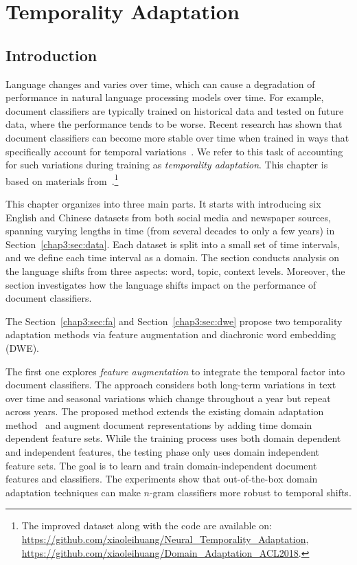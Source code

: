 \chapter{Temporality Adaptation}
\label{chp:temporality}

\section{Introduction}
Language changes and varies over time,
which can cause a degradation of performance in
natural language processing models over time.
For example, document classifiers are typically trained on historical data and tested on future data, where the performance tends to be worse.
Recent research has shown that document classifiers can become more stable over time when trained in ways that specifically account for temporal variations~\cite{he2018time}.
We refer to this task of accounting for such variations during training as {\em temporality adaptation}.
This chapter is based on materials from~\cite{huang2018examining, huang2019neural}.\footnote{The improved dataset along with the code are available on: \\\url{https://github.com/xiaoleihuang/Neural_Temporality_Adaptation}, \\\url{https://github.com/xiaoleihuang/Domain_Adaptation_ACL2018}.}

This chapter organizes into three main parts.
It starts with introducing six English and Chinese datasets from both social media and newspaper sources, spanning varying lengths in time (from several decades to only a few years) in Section~\ref{chap3:sec:data}. 
Each dataset is split into a small set of time intervals, and we define each time interval as a domain. 
The section conducts analysis on the language shifts from three aspects: word, topic, context levels. 
Moreover, the section investigates how the language shifts impact on the performance of document classifiers.

The Section~\ref{chap3:sec:fa} and Section~\ref{chap3:sec:dwe} propose two temporality adaptation methods via feature augmentation and diachronic word embedding (DWE).

The first one explores \textit{feature augmentation} to integrate the temporal factor into document classifiers.
The approach considers both long-term variations in text over time and seasonal variations which change throughout a year but repeat across years.
The proposed method extends the existing domain adaptation method~\cite{daume2007frustratingly} and augment document representations by adding time domain dependent feature sets.
While the training process uses both domain dependent and independent features, the testing phase only uses domain independent feature sets.
The goal is to learn and train domain-independent document features and classifiers.
The experiments show that out-of-the-box domain adaptation techniques can make $n$-gram classifiers more robust to temporal shifts.

